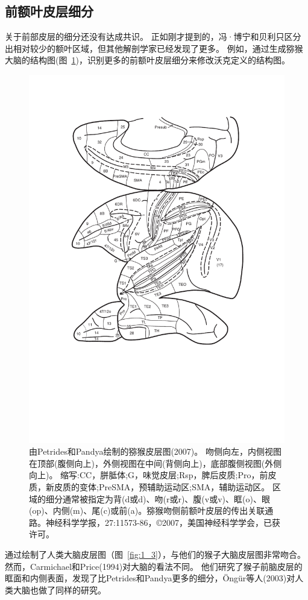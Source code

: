 \subsection{前额叶皮层细分}
关于前部皮层的细分还没有达成共识。
正如刚才提到的，冯·博宁和贝利只区分出相对较少的额叶区域，但其他解剖学家已经发现了更多。
例如，通过生成猕猴大脑的结构图(图~\ref{fig:1_2})，识别更多的前额叶皮层细分来修改沃克定义的结构图。


\begin{figure}[!htb]
	\centering
	\includegraphics[width=0.65\linewidth]{chap1/1_2}
	\caption{由Petrides和Pandya绘制的猕猴皮层图(2007)。
		吻侧向左，内侧视图在顶部(腹侧向上)，外侧视图在中间(背侧向上)，底部腹侧视图(外侧向上)。
		缩写:CC，胼胝体;G，味觉皮层;Rsp，脾后皮质;Pro，前皮质，新皮质的变体;PreSMA，预辅助运动区;SMA，辅助运动区。
		区域的细分通常被指定为背(d或d)、吻(r或r)、腹(v或v)、眶(o)、眼(op)、内侧(m)、尾(c)或前(a)。猕猴吻侧前额叶皮层的传出关联通路。神经科学学报，27:11573-86，©2007，美国神经科学学会，已获许可。\label{fig:1_2}}
\end{figure}


\par
通过绘制了人类大脑皮层图（图~\ref{fig:1_3}），与他们的猴子大脑皮层图非常吻合\cite{petrides1995impairments}。
然而，Carmichael和Price(1994)对大脑的看法不同\cite{carmichael1994architectonic}。
他们研究了猴子前脑皮层的眶面和内侧表面，发现了比Petrides和Pandya更多的细分，Öngür等人(2003)对人类大脑也做了同样的研究\cite{ongur2003architectonic}。

